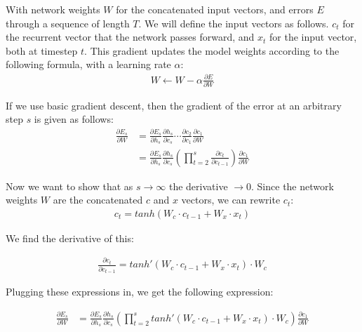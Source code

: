 \noindent
With network weights $W$ for the concatenated input vectors, and errors $E$ through a sequence of length $T$. We will define the input vectors as follows. $c_t$ for the recurrent vector that the network passes forward, and $x_t$ for the input vector, both at timestep $t$.
This gradient updates the model weights according to the following formula, with a learning rate $\alpha$:\\

\begin{align}
    W \leftarrow W - \alpha \frac{\partial E}{\partial W}
\end{align}

\noindent
If we use basic gradient descent, then the gradient of the error at an arbitrary step $s$ is given as follows:\\

\begin{align}
    \frac{\partial E_s}{\partial W} &= \frac{\partial E_s}{\partial h_s}\frac{\partial h_s}{\partial c_s} \cdots \frac{\partial c_2}{\partial c_1} \frac{\partial c_1}{\partial W} \\
    &= \frac{\partial E_s}{\partial h_s}\frac{\partial h_s}{\partial c_s} \left(\prod_{t=2}^s\frac{\partial c_t}{\partial c_{t-1}} \right) \frac{\partial c_1} {\partial W}
\end{align}

\noindent
Now we want to show that as $s \rightarrow \infty$ the derivative $\rightarrow 0$. Since the network weights $W$ are the concatenated $c$ and $x$ vectors, we can rewrite $c_t$:\\

\begin{align}
    c_t = tanh(W_c \cdot c_{t-1} + W_x \cdot x_t)
\end{align}

\noindent
We find the derivative of this:

\begin{align}
    \frac{\partial c_t}{\partial c_{t-1}} = tanh'(W_c \cdot c_{t-1} + W_x \cdot x_t) \cdot W_c
\end{align}

\noindent
Plugging these expressions in, we get the following expression:

\begin{align}
    \frac{\partial E_s}{\partial W} &= \frac{\partial E_s}{\partial h_s}\frac{\partial h_s}{\partial c_s} \left(\prod_{t=2}^s tanh'(W_c \cdot c_{t-1} + W_x \cdot x_t) \cdot W_c \right) \frac{\partial c_1}{\partial W}
\end{align}

